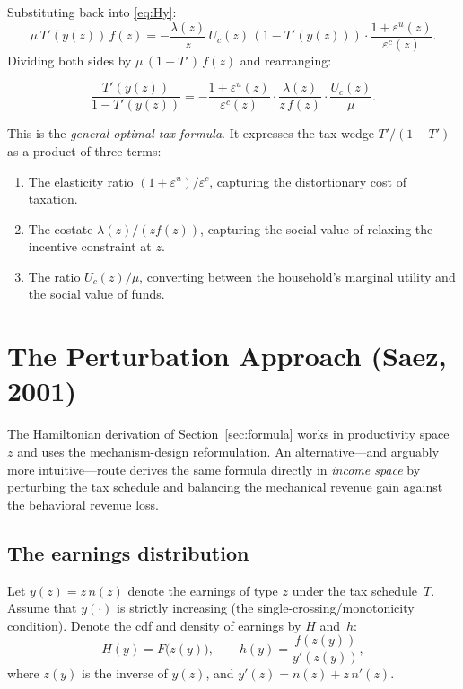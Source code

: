 \documentclass[12pt,a4paper]{article}
\theoremstyle{definition}
\theoremstyle{plain}
\theoremstyle{remark}
\begin{document}
Substituting back into \eqref{eq:Hy}:
\[
  \mu \, T'(y(z)) \, f(z) = -\frac{\lambda(z)}{z} \, U_c(z) \, (1 - T'(y(z))) \cdot \frac{1+\varepsilon^u(z)}{\varepsilon^c(z)}.
\]
Dividing both sides by $\mu \,(1-T')\,f(z)$ and rearranging:

\begin{equation}
\label{eq:general_tax}
  \boxed{
  \frac{T'(y(z))}{1 - T'(y(z))}
  = -\frac{1 + \varepsilon^u(z)}{\varepsilon^c(z)} \cdot \frac{\lambda(z)}{z \, f(z)} \cdot \frac{U_c(z)}{\mu}.
  }
\end{equation}

This is the \emph{general optimal tax formula}. It expresses the tax wedge $T'/(1-T')$ as a product of three terms:
\begin{enumerate}[label=(\roman*)]
  \item The elasticity ratio $(1+\varepsilon^u)/\varepsilon^c$, capturing the distortionary cost of taxation.
  \item The costate $\lambda(z)/(z f(z))$, capturing the social value of relaxing the incentive constraint at $z$.
  \item The ratio $U_c(z)/\mu$, converting between the household's marginal utility and the social value of funds.
\end{enumerate}

\section{The Perturbation Approach (Saez, 2001)}
\label{sec:perturbation}

The Hamiltonian derivation of Section~\ref{sec:formula} works in
productivity space~$z$ and uses the mechanism-design reformulation.
An alternative---and arguably more intuitive---route derives the
same formula directly in \emph{income space} by perturbing the
tax schedule and balancing the mechanical revenue gain against the
behavioral revenue loss. 

\subsection{The earnings distribution}

Let $y(z)=z\,n(z)$ denote the earnings of type $z$ under the
tax schedule~$T$. Assume that $y(\cdot)$ is strictly increasing
(the single-crossing/monotonicity condition). Denote the cdf and
density of earnings by $H$ and~$h$:
\begin{equation}
\label{eq:H-def}
  H(y) = F\!\bigl(z(y)\bigr), \qquad
  h(y) = \frac{f(z(y))}{y'(z(y))},
\end{equation}
where $z(y)$ is the inverse of $y(z)$, and $y'(z)=n(z)+z\,n'(z)$.
\end{document}
